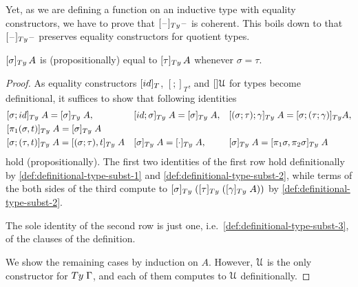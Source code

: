 \documentclass[a4paper,UKenglish,numberwithinsect,cleveref,thm-restate]{lipics-v2021}
\newcommand{\danger}{\marginpar[\hfill\dbend]{\dbend\hfill}}
\newcommand{\LT}[2][]{\todo[inline,author={L-T},caption={},#1]{#2}}
\begin{document}
Yet, as we are defining a function on an inductive type with equality constructors, we have to prove that $[\blank]_{\Ty}\blank$ is coherent.\LT{general condition?} 
This boils down to that $[\blank]_{\Ty}\blank$ preserves equality constructors for quotient types.
\begin{proposition}[Coherence]
  $[\sigma]_{\Ty}\,A$ is (propositionally) equal to $[\tau]_{\Ty}\,A$ whenever $\sigma = \tau$.
  \danger
\end{proposition}
\begin{proof}
  As equality constructors $[\idS]_T$, $[;]_T$, and $[]\mathcal{U}$ for types become definitional, it suffices to show that following identities
  \begin{align*}
    & [\sigma;\idS]_{\Ty} \;A = [\sigma]_{\Ty}\;A,
    && [\idS;\sigma]_{\Ty} \;A = [\sigma]_{\Ty}\;A, && [(\sigma;\tau);\gamma]_{\Ty} \;A = [\sigma; (\tau; \gamma)]_{\Ty}A, \\
    & [\pi_1(\sigma, t)]_{\Ty}\;A = [\sigma]_{\Ty}\;A \\
    & [\sigma; (\tau, t)]_{\Ty} \;A = [(\sigma;\tau), t]_{\Ty}\;A && [\sigma]_{\Ty} \;A = [\emptyctx]_{\Ty}\;A, && [\sigma]_{\Ty} \;A = [\pi_1\sigma, \pi_2\sigma]_{\Ty}\;A
  \end{align*}
  hold (propositionally).
  The first two identities of the first row hold definitionally by \eqref{def:definitional-type-subst-1} and \eqref{def:definitional-type-subst-2}, while terms of the both sides of the third compute to $[\sigma]_{\Ty}\;([\tau]_{\Ty}\;([\gamma]_{\Ty}\;A))$ by \eqref{def:definitional-type-subst-2}.

  The sole identity of the second row is just one, i.e.\ \eqref{def:definitional-type-subst-3}, of the clauses of the definition.

  We show the remaining cases by induction on $A$.
  However, $\mathcal{U}$ is the only constructor for $\Ty\;\Gamma$, and each of them computes to $\mathcal{U}$ definitionally.
\end{proof}
\end{document}
